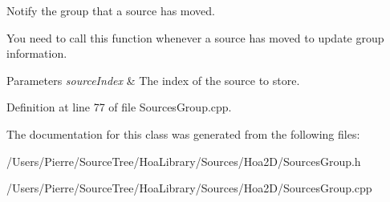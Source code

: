 Notify the group that a source has moved. 

You need to call this function whenever a source has moved to update group information. 
\begin{DoxyParams}{Parameters}
{\em source\-Index} & The index of the source to store. \\
\hline
\end{DoxyParams}


Definition at line 77 of file Sources\-Group.\-cpp.



The documentation for this class was generated from the following files\-:\begin{DoxyCompactItemize}
\item 
/\-Users/\-Pierre/\-Source\-Tree/\-Hoa\-Library/\-Sources/\-Hoa2\-D/Sources\-Group.\-h\item 
/\-Users/\-Pierre/\-Source\-Tree/\-Hoa\-Library/\-Sources/\-Hoa2\-D/Sources\-Group.\-cpp\end{DoxyCompactItemize}
